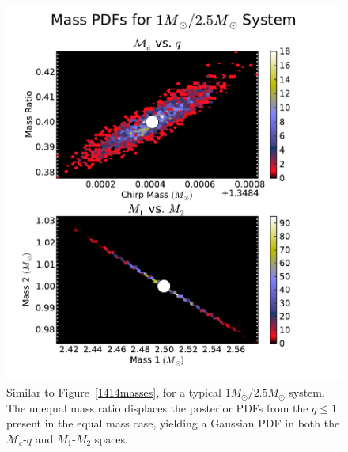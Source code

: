 \documentclass[11pt,a4paper]{emulateapj}
\newcommand{\chmass}{\mathcal{M}_c}
\begin{document}
\begin{figure}[h!]
  \centering
 \includegraphics[trim=1cm 0cm 2cm 0cm, clip=false,scale=0.63]{125masses2D.pdf}
 \caption{Similar to Figure~\ref{1414masses}, for a typical $1M_{\odot}/2.5M_{\odot}$ system.  The unequal mass ratio displaces the posterior PDFs from the $q \leq 1$ present in the equal mass case, yielding a Gaussian PDF in both the $\chmass$-$q$ and $M_1$-$M_2$ spaces.}
  \label{125masses}
\end{figure}
\end{document}
